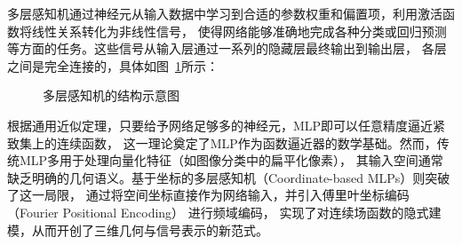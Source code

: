 多层感知机通过神经元从输入数据中学习到合适的参数权重和偏置项，利用激活函数将线性关系转化为非线性信号，
使得网络能够准确地完成各种分类或回归预测等方面的任务。这些信号从输入层通过一系列的隐藏层最终输出到输出层，
各层之间是完全连接的，具体如图~\ref{fig:mlp}所示：

\begin{figure}[htb]
  \centering
\caption{多层感知机的结构示意图}
\label{fig:mlp}
\end{figure}

根据通用近似定理\cite{Hornik_1989}，只要给予网络足够多的神经元，MLP即可以任意精度逼近紧致集上的连续函数，
这一理论奠定了MLP作为函数逼近器的数学基础。然而，传统MLP多用于处理向量化特征（如图像分类中的扁平化像素），
其输入空间通常缺乏明确的几何语义。基于坐标的多层感知机（Coordinate-based MLPs）则突破了这一局限，
通过将空间坐标直接作为网络输入，并引入傅里叶坐标编码（Fourier Positional Encoding）
进行频域编码\cite{tancik2020fourier}，
实现了对连续场函数的隐式建模，从而开创了三维几何与信号表示的新范式。

